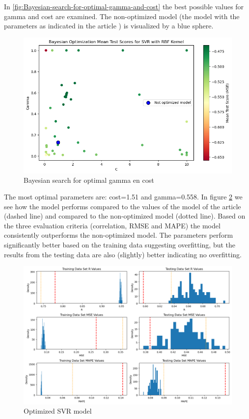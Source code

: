 \documentclass{article}
\begin{document}
In \autoref{fig:Bayesian-search-for-optimal-gamma-and-cost} the best possible values for gamma and cost are examined. The non-optimized model (the model with the parameters as indicated in the article \cite{dahal2021prediction} ) is visualized by a blue sphere.
\begin{figure}
    \centering
    \includegraphics[width=\linewidth]{figures/bayesian_optimization.png}
    \caption{Bayesian search for optimal gamma en cost}
    \label{fig:Bayesian-search-for-optimal-gamma-and-cost}
\end{figure}

The most optimal parameters are: cost=1.51 and gamma=0.558.
In figure \ref{fig:optimized-SVR-model} we see how the model performs compared to the values of the model of the article \cite{dahal2021prediction} (dashed line) and compared to the non-optimized model (dotted line). 
Based on the three evaluation criteria (correlation, RMSE and MAPE) the model consistently outperforms the non-optimized model. The parameters perform significantly better based on the training data suggesting overfitting, but the results from the testing data are also (slightly) better indicating no overfitting.
\begin{figure}
	\centering
	\includegraphics[width=\linewidth]{figures/SVR_optimized_model.png}
	\caption{Optimized SVR model}
	\label{fig:optimized-SVR-model}
\end{figure}
\end{document}

